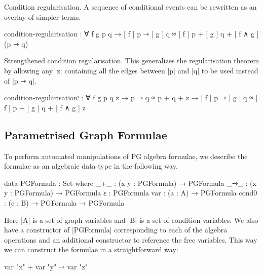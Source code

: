 Condition regularisation. A sequence of conditional events can be rewritten as an overlay of simpler terms.
\begin{code}
  condition-regularisation : ∀ f g p q → 
    [ f ] p ⇾ [ g ] q ≈ [ f ] p + [ g ] q + [ f ∧ g ] (p ⇾ q)
\end{code}

Strengthened condition regularisation. This generalizes the regularisation theorem by allowing any |z| containing all the edges between |p| and |q| to be used instead of |p ⇾ q|.
\begin{code}
  condition-regularisationˢ : ∀ f g p q z
                              → p ⇾ q ≈ p + q + z
                              → [ f ] p ⇾ [ g ] q ≈ [ f ] p + [ g ] q + [ f ∧ g ] z
\end{code}

\subsection{Parametrised Graph Formulae}

To perform automated manipulations of PG algebra formulae, we describe the formulae as an algebraic data type in the following way.



\begin{code}
 data PGFormula : Set where
  _+_ : (x y : PGFormula) → PGFormula
  _⇾_ : (x y : PGFormula) → PGFormula
  ε : PGFormula
  var : (a : A) → PGFormula
  cond0 : (c : B) → PGFormula → PGFormula
\end{code}


Here |A| is a set of graph variables and |B| is a set of condition variables.
We also have a constructor of |PGFormula| corresponding to each of the algebra operations and an additional constructor to reference the free variables.
This way we can construct the formulae in a straightforward way: 

\begin{code}
var "x" + var "y" ⇾ var "z"
\end{code}

